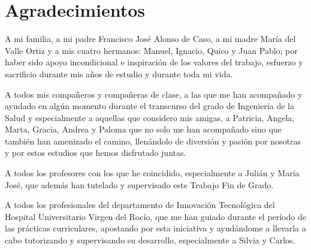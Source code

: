 \chapter*{Agradecimientos}

A mi familia, a mi padre Francisco José Alonso de Caso, a mi madre María del Valle Ortiz y a mis cuatro hermanos: Manuel, Ignacio, Quico y Juan Pablo; por haber sido apoyo incondicional e inspiración de los valores del trabajo, esfuerzo y sacrificio durante mis años de estudio y durante toda mi vida.

A todos mis compañeros y compañeras de clase, a las que me han acompañado y ayudado en algún momento durante el transcurso del grado de Ingeniería de la Salud y especialmente a aquellas que considero mis amigas, a Patricia, Angela, Marta, Gracia, Andrea y Paloma  que no solo me han acompañado sino que también han amenizado el camino, llenándolo de diversión y pasión por nosotras y por estos estudios que hemos disfrutado juntas.

A todos los profesores con los que he coincidido, especialmente a Julián y María José, que además han tutelado y supervisado este Trabajo Fin de Grado.

A todos los profesionales del departamento de Innovación Tecnológica del Hospital Universitario Virgen del Rocío, que me han guiado durante el período de las prácticas curriculares, apostando por esta iniciativa y ayudándome a llevarla a cabo tutorizando y supervisando su desarrollo, especialmente a Silvia y Carlos.
